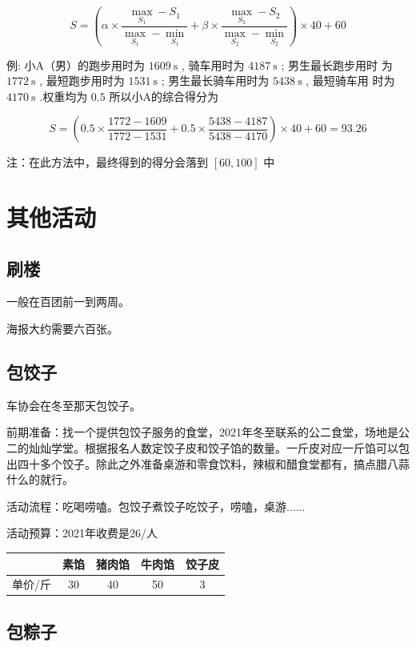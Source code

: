 \documentclass{ctexbook}
\begin{document}
\[S=\left(\alpha \times \frac{\max _{S_{1}}-S_{1}}{\max _{S_{1}}-\min _{S_{1}}}+\beta\times \frac{\max _{S_{2}}-S_{2}}{\max _{S_{2}}-\min _{S_{2}}}\right) \times 40+60\]

例: 小A（男）的跑步用时为  $1609 \mathrm{~s}$ , 骑车用时为  4$187 \mathrm{~s}$ ; 男生最长跑步用时 为  $1772 \mathrm{~s}$ , 最短跑步用时为  $1531 \mathrm{~s}$ ; 男生最长骑车用时为  $5438 \mathrm{~s}$ , 最短骑车用 时为  $4170 \mathrm{~s}$ .权重均为 $0.5$ 所以小A的综合得分为

\[S=\left(0.5 \times \frac{1772-1609}{1772-1531}+0.5 \times \frac{5438-4187}{5438-4170}\right) \times 40+60=93.26\]

注：在此方法中，最终得到的得分会落到 $[60,100]$ 中

\section{其他活动}
\subsection{刷楼}
一般在百团前一到两周。

海报大约需要六百张。

\subsection{包饺子}
车协会在冬至那天包饺子。

前期准备：找一个提供包饺子服务的食堂，2021年冬至联系的公二食堂，场地是公二的灿灿学堂。根据报名人数定饺子皮和饺子馅的数量。一斤皮对应一斤馅可以包出四十多个饺子。除此之外准备桌游和零食饮料，辣椒和醋食堂都有，搞点腊八蒜什么的就行。

活动流程：吃喝唠嗑。包饺子煮饺子吃饺子，唠嗑，桌游......

活动预算：2021年收费是26/人
\begin{table}[H]
    \centering
    \begin{tabular}{|c|c|c|c|c|}
    \hline
    ~  & 素馅 & 猪肉馅 & 牛肉馅 & 饺子皮 \\ \hline
    单价/斤 & 30 & 40  & 50  & 3   \\ \hline
    \end{tabular}
\end{table}

\subsection{包粽子}
\end{document}
